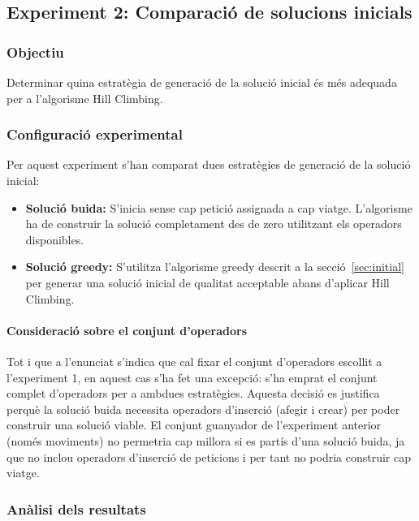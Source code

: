 \subsection{Experiment 2: Comparació de solucions inicials}

\vspace{0.75cm}

\subsubsection{Objectiu}
Determinar quina estratègia de generació de la solució inicial és més adequada per a l'algorisme Hill Climbing.

\subsubsection{Configuració experimental}

Per aquest experiment s'han comparat dues estratègies de generació de la solució inicial:

\begin{itemize}
    \item \textbf{Solució buida:} S'inicia sense cap petició assignada a cap viatge. L'algorisme ha de construir la solució completament des de zero utilitzant els operadors disponibles.
    
    \item \textbf{Solució greedy:} S'utilitza l'algorisme greedy descrit a la secció~\ref{sec:initial} per generar una solució inicial de qualitat acceptable abans d'aplicar Hill Climbing.
\end{itemize}

\paragraph{Consideració sobre el conjunt d'operadors}

Tot i que a l'enunciat s'indica que cal fixar el conjunt d'operadors escollit a l'experiment 1, en aquest cas s'ha fet una excepció: s'ha emprat el conjunt complet d'operadors per a ambdues estratègies. Aquesta decisió es justifica perquè la solució buida necessita operadors d'inserció (afegir i crear) per poder construir una solució viable. El conjunt guanyador de l'experiment anterior (només moviments) no permetria cap millora si es partís d'una solució buida, ja que no inclou operadors d'inserció de peticions i per tant no podria construir cap viatge.

\subsubsection{Anàlisi dels resultats}

